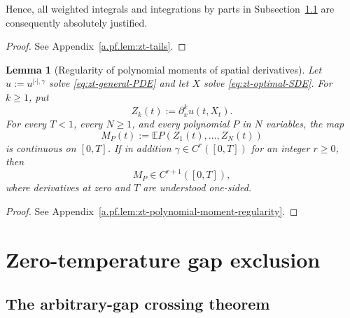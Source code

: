 \documentclass[10pt]{amsart}
\newtheorem{lemma}[lemma]{Lemma}
\theoremstyle{definition}
\theoremstyle{remark}
\numberwithin{equation}{section}
\newcommand{\E}{\mathbb E}
\newcommand{\1}{\mathbf 1}
\begin{document}
Hence, all weighted integrals and integrations by parts in Subsection~\ref{sec:zt-crossing} are consequently absolutely justified.

\begin{proof}
See Appendix~\ref{a.pf.lem:zt-tails}.
\end{proof}


\begin{lemma}[Regularity of polynomial moments of spatial derivatives]
\label{lem:zt-polynomial-moment-regularity}
Let $u:=u^{|\cdot|,\gamma}$ solve \eqref{eq:zt-general-PDE} and let $X$ solve \eqref{eq:zt-optimal-SDE}. For $k\geq1$, put
\begin{equation*}
 Z_k(t):=\partial_x^ku(t,X_t).
\end{equation*}
For every $T<1$, every $N\geq1$, and every polynomial $P$ in $N$ variables, the map
\begin{equation*}
 M_P(t):=\E P(Z_1(t),\ldots,Z_N(t))
\end{equation*}
is continuous on $[0,T]$.  If in addition $\gamma\in C^r([0,T])$ for an integer $r\geq0$, then
\begin{equation*}
 M_P\in C^{r+1}([0,T]),
\end{equation*}
where derivatives at zero and $T$ are understood one-sided.
\end{lemma}

\begin{proof}
See Appendix~\ref{a.pf.lem:zt-polynomial-moment-regularity}.
\end{proof}

\section{Zero-temperature gap exclusion}
\label{sec:zero-temperature-support}

\subsection{The arbitrary-gap crossing theorem}
\label{sec:zt-crossing}
\end{document}
